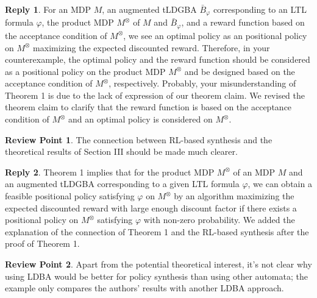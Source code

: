 \documentclass[10 pt, dvipdfmx]{article}
\theoremstyle{definition}
\newtheorem{review point}{Review Point}[section]
\newtheorem*{reply}{Reply}
\begin{document}
\begin{reply}
  For an MDP $M$, an augmented tLDGBA $\bar{B}_{\varphi}$ corresponding to an LTL formula $\varphi$, the product MDP $M^{\otimes}$ of $M$ and $\bar{B}_{\varphi}$, and a reward function based on the acceptance condition of $M^{\otimes}$, we see an optimal policy as an positional policy on $M^{\otimes}$ maximizing the expected discounted reward. Therefore, in your counterexample, the optimal policy and the reward function should be considered as a positional policy on the product MDP $M^{\otimes}$ and be designed based on the acceptance condition of $M^{\otimes}$, respectively. Probably, your misunderstanding of Theorem 1 is due to the lack of expression of our theorem claim. We revised the theorem claim to clarify that the reward function is based on the acceptance condition of $M^{\otimes}$ and an optimal policy is considered on $M^{\otimes}$.
\end{reply}

\begin{review point}
  The connection between RL-based synthesis and the theoretical results
of Section III should be made much clearer.
\end{review point}

\begin{reply}
  Theorem 1 implies that for the product MDP $M^{\otimes}$ of an MDP $M$ and an augmented tLDGBA corresponding to a given LTL formula $\varphi$, we can obtain a feasible positional policy satisfying $\varphi$ on $M^{\otimes}$ by an algorithm maximizing the expected discounted reward with large enough discount factor if there exists a positional policy on $M^{\otimes}$ satisfying $\varphi$ with non-zero probability. We added the explanation of the connection of Theorem 1 and the RL-based synthesis after the proof of Theorem 1.
\end{reply}

\begin{review point}
  Apart from the potential theoretical interest, it's not clear why
using LDBA would be better for policy synthesis than using other
automata; the example only compares the authors' results with another
LDBA approach.
\end{review point}
\end{document}

